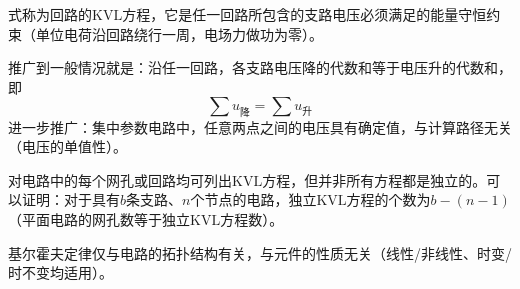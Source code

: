 式称为回路的$\mathrm{KVL}$方程，它是任一回路所包含的支路电压必须满足的能量守恒约束（单位电荷沿回路绕行一周，电场力做功为零）。

推广到一般情况就是：沿任一回路，各支路电压降的代数和等于电压升的代数和，即
\[
\sum u_{\text{降}}=\sum u_{\text{升}}
\]
进一步推广：集中参数电路中，任意两点之间的电压具有确定值，与计算路径无关（电压的单值性）。

对电路中的每个网孔或回路均可列出$\mathrm{KVL}$方程，但并非所有方程都是独立的。可以证明：对于具有$b$条支路、$n$个节点的电路，独立$\mathrm{KVL}$方程的个数为$b-(n-1)$（平面电路的网孔数等于独立$\mathrm{KVL}$方程数）。

基尔霍夫定律仅与电路的拓扑结构有关，与元件的性质无关（线性/非线性、时变/时不变均适用）。